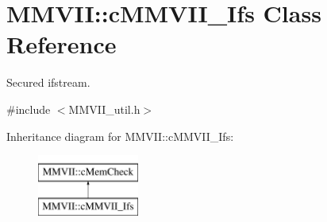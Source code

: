 \hypertarget{classMMVII_1_1cMMVII__Ifs}{}\section{M\+M\+V\+II\+:\+:c\+M\+M\+V\+I\+I\+\_\+\+Ifs Class Reference}
\label{classMMVII_1_1cMMVII__Ifs}


Secured ifstream.  




{\ttfamily \#include $<$M\+M\+V\+I\+I\+\_\+util.\+h$>$}

Inheritance diagram for M\+M\+V\+II\+:\+:c\+M\+M\+V\+I\+I\+\_\+\+Ifs\+:\begin{figure}[H]
\begin{center}
\leavevmode
\includegraphics[height=2.000000cm]{classMMVII_1_1cMMVII__Ifs}
\end{center}
\end{figure}
